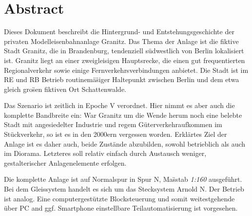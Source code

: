 \section*{Abstract}
\label{sec:abstract}

Dieses Dokument beschreibt die Hintergrund- und Entstehungsgeschichte der privaten Modelleisenbahnanlage Granitz.
Das Thema der Anlage ist die fiktive Stadt Granitz, die in Brandenburg, tendenziell s\"udwestlich von Berlin lokalisiert ist.
Granitz liegt an einer zweigleisigen Hauptsrecke, die einen gut frequentierten Regionalverkehr sowie einige Fernverkehrsverbindungen anbietet.
Die Stadt ist im RE und RB Betrieb routinem\"a\"siger Haltepunkt zwischen Berlin und dem etwa gleich gro\"sen fiktiven Ort Schattenwalde.

Das Szenario ist zeitlich in Epoche V verordnet.
Hier nimmt es aber auch die komplette Bandbreite ein:
War Granitz um die Wende herum noch eine belebte Stadt mit angesiedelter Industrie und regem G\"uterverkehraufkommen im St\"uckverkehr, so ist es in den 2000ern vergessen worden.
Erkl\"artes Ziel der Anlage ist es daher auch, beide Zust\"ande abzubilden, sowohl betrieblich als auch im Diorama.
Letzteres soll relativ einfach durch Austausch weniger, gestalterischer Anlagenelemente erfolgen.

Die komplette Anlage ist auf Normalspur in Spur N, Ma\"sstab \textit{1:160} ausgef\"uhrt.
Bei dem Gleissystem handelt es sich um das Stecksystem Arnold N.
Der Betrieb ist analog.
Eine computergest\"utzte Blocksteuerung und somit weitestgehende \"uber PC and ggf. Smartphone einstellbare Teilautomatisierung ist vorgesehen.